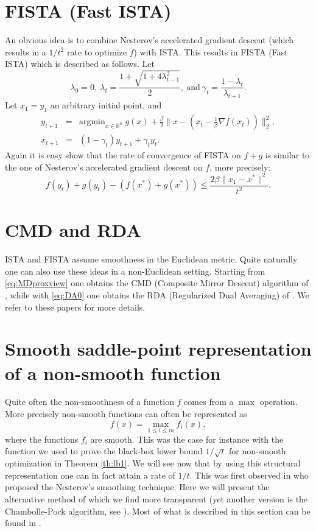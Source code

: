 \section*{FISTA (Fast ISTA)}
An obvious idea is to combine Nesterov's accelerated gradient descent (which results in a $1/t^2$ rate to optimize $f$) with ISTA. This results in FISTA (Fast ISTA) which is described as follows. Let
$$\lambda_0 = 0, \ \lambda_{t} = \frac{1 + \sqrt{1+ 4 \lambda_{t-1}^2}}{2}, \ \text{and} \  \gamma_t = \frac{1 - \lambda_t}{\lambda_{t+1}}.$$
Let $x_1 = y_1$ an arbitrary initial point, and
\begin{eqnarray*}
y_{t+1} & = & \mathrm{argmin}_{x \in \mathbb{R}^n} \ g(x) + \frac{\beta}{2} \|x - (x_t - \frac1{\beta} \nabla f(x_t)) \|_2^2 , \\
x_{t+1} & = & (1 - \gamma_t) y_{t+1} + \gamma_t y_t .
\end{eqnarray*}
Again it is easy show that the rate of convergence of FISTA on $f+g$ is similar to the one of Nesterov's accelerated gradient descent on $f$, more precisely:
$$f(y_t) + g(y_t) - (f(x^*) + g(x^*)) \leq \frac{2 \beta \|x_1 - x^*\|^2}{t^2} .$$

\section*{CMD and RDA}
ISTA and FISTA assume smoothness in the Euclidean metric. Quite naturally one can also use these ideas in a non-Euclidean setting. Starting from \eqref{eq:MDproxview} one obtains the CMD (Composite Mirror Descent) algorithm of \cite{DSSST10}, while with \eqref{eq:DA0} one obtains the RDA (Regularized Dual Averaging) of \cite{Xia10}. We refer to these papers for more details.

\section{Smooth saddle-point representation of a non-smooth function} \label{sec:sprepresentation}
Quite often the non-smoothness of a function $f$ comes from a $\max$ operation. More precisely non-smooth functions can often be represented as
\begin{equation} \label{eq:sprepresentation}
f(x) = \max_{1 \leq i \leq m} f_i(x) ,
\end{equation}
where the functions $f_i$ are smooth. This was the case for instance with the function we used to prove the black-box lower bound $1/\sqrt{t}$ for non-smooth optimization in Theorem \ref{th:lb1}. We will see now that by using this structural representation one can in fact attain a rate of $1/t$. This was first observed in \cite{Nes04b} who proposed the Nesterov's smoothing technique. Here we will present the alternative method of \cite{Nem04} which we find more transparent (yet another version is the Chambolle-Pock algorithm, see \cite{CP11}). Most of what is described in this section can be found in \cite{JN11a, JN11b}.

